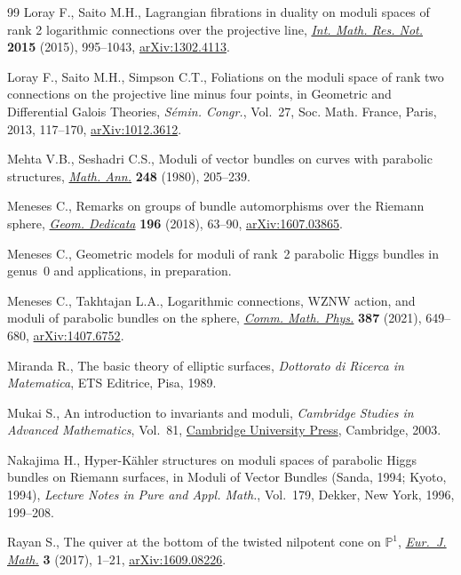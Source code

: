 \begin{thebibliography}{99}
Loray F., Saito M.H., Lagrangian fibrations in duality on moduli spaces of rank
 2 logarithmic connections over the projective line, \href{https://doi.org/10.1093/imrn/rnt232}{\textit{Int. Math. Res.
 Not.}} \textbf{2015} (2015), 995--1043, \href{https://arxiv.org/abs/1302.4113}{arXiv:1302.4113}.

Loray F., Saito M.H., Simpson C.T., Foliations on the moduli space of rank two
 connections on the projective line minus four points, in Geometric and
 Differential {G}alois Theories, \textit{S\'emin. Congr.}, Vol.~27, Soc. Math.
 France, Paris, 2013, 117--170, \href{https://arxiv.org/abs/1012.3612}{arXiv:1012.3612}.

Mehta V.B., Seshadri C.S., Moduli of vector bundles on curves with parabolic
 structures, \href{https://doi.org/10.1007/BF01420526}{\textit{Math. Ann.}} \textbf{248} (1980), 205--239.

Meneses C., Remarks on groups of bundle automorphisms over the {R}iemann
 sphere, \href{https://doi.org/10.1007/s10711-017-0309-y}{\textit{Geom. Dedicata}} \textbf{196} (2018), 63--90,
 \href{https://arxiv.org/abs/1607.03865}{arXiv:1607.03865}.

Meneses C., Geometric models for moduli of rank~2 parabolic {H}iggs bundles in
 genus~0 and applications, {i}n preparation.

Meneses C., Takhtajan L.A., Logarithmic connections, {WZNW} action, and moduli
 of parabolic bundles on the sphere, \href{https://doi.org/10.1007/s00220-021-04183-y}{\textit{Comm. Math. Phys.}} \textbf{387}
 (2021), 649--680, \href{https://arxiv.org/abs/1407.6752}{arXiv:1407.6752}.

Miranda R., The basic theory of elliptic surfaces, \textit{Dottorato di Ricerca in
 Matematica}, ETS Editrice, Pisa, 1989.

Mukai S., An introduction to invariants and moduli, \textit{Cambridge Studies
 in Advanced Mathematics}, Vol.~81, \href{https://doi.org/10.1017/CBO9781316257074}{Cambridge University Press}, Cambridge,
 2003.

Nakajima H., Hyper-{K}\"ahler structures on moduli spaces of parabolic {H}iggs
 bundles on {R}iemann surfaces, in Moduli of Vector Bundles ({S}anda, 1994;
 {K}yoto, 1994), \textit{Lecture Notes in Pure and Appl. Math.}, Vol.~179,
 Dekker, New York, 1996, 199--208.

Rayan S., The quiver at the bottom of the twisted nilpotent cone on
 {$\mathbb{P}^1$}, \href{https://doi.org/10.1007/s40879-016-0120-6}{\textit{Eur.~J. Math.}} \textbf{3} (2017), 1--21,
 \href{https://arxiv.org/abs/1609.08226}{arXiv:1609.08226}.


\end{thebibliography}
